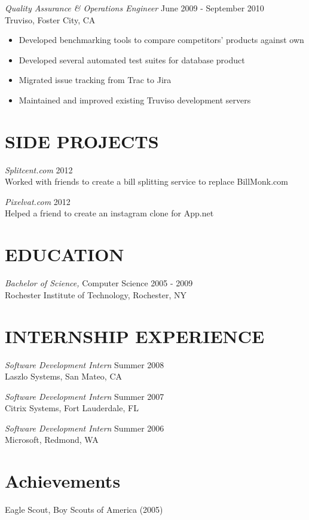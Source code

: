 \documentclass[line,margin]{res}
\begin{document}
\begin{resume}
                {\sl Quality Assurance \& Operations Engineer} \hfill June 2009 - September 2010 \\
                Truviso, Foster City, CA
                \begin{itemize}  \itemsep -2pt %
                 \item Developed benchmarking tools to compare competitors' products against own
                 \item Developed several automated test suites for database product
                 \item Migrated issue tracking from Trac to Jira
                 \item Maintained and improved existing Truviso development servers
                \end{itemize}
                
\section{SIDE PROJECTS}

                {\sl Splitcent.com} \hfill        2012 \\
                Worked with friends to create a bill splitting service to replace BillMonk.com
                
                {\sl Pixelvat.com} \hfill        2012 \\
                Helped a friend to create an instagram clone for App.net
                
\section{EDUCATION} {\sl Bachelor of Science,} Computer Science \hfill    2005 - 2009 \\
                Rochester Institute of Technology, Rochester, NY
                
\section{INTERNSHIP EXPERIENCE}
                
                {\sl Software Development Intern} \hfill        Summer 2008 \\
                Laszlo Systems, San Mateo, CA
                
                {\sl Software Development Intern} \hfill        Summer 2007 \\
                Citrix Systems, Fort Lauderdale, FL
                
                {\sl Software Development Intern} \hfill          Summer 2006 \\
                Microsoft, Redmond, WA
           
\section{Achievements}             
            Eagle Scout, Boy Scouts of America (2005) \\
 
\end{resume}
\end{document}
